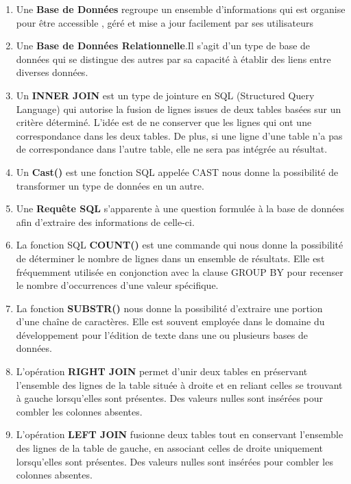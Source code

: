 \documentclass[
]{article}
\begin{document}
\begin{enumerate}
\def\labelenumi{\arabic{enumi}.}
\item
  Une \textbf{Base de Données} regroupe un ensemble d'informations qui
  est organise pour être accessible , géré et mise a jour facilement par
  ses utilisateurs
\item
  Une \textbf{Base de Données Relationnelle}.Il s'agit d'un type de base
  de données qui se distingue des autres par sa capacité à établir des
  liens entre diverses données.
\item
  Un \textbf{INNER JOIN} est un type de jointure en SQL (Structured
  Query Language) qui autorise la fusion de lignes issues de deux tables
  basées sur un critère déterminé. L'idée est de ne conserver que les
  lignes qui ont une correspondance dans les deux tables. De plus, si
  une ligne d'une table n'a pas de correspondance dans l'autre table,
  elle ne sera pas intégrée au résultat.
\item
  Un \textbf{Cast()} est une fonction SQL appelée CAST nous donne la
  possibilité de transformer un type de données en un autre.
\item
  Une \textbf{Requête SQL} s'apparente à une question formulée à la base
  de données afin d'extraire des informations de celle-ci.
\item
  La fonction SQL \textbf{COUNT()} est une commande qui nous donne la
  possibilité de déterminer le nombre de lignes dans un ensemble de
  résultats. Elle est fréquemment utilisée en conjonction avec la clause
  GROUP BY pour recenser le nombre d'occurrences d'une valeur
  spécifique.
\item
  La fonction \textbf{SUBSTR()} nous donne la possibilité d'extraire une
  portion d'une chaîne de caractères. Elle est souvent employée dans le
  domaine du développement pour l'édition de texte dans une ou plusieurs
  bases de données.
\item
  L'opération \textbf{RIGHT JOIN} permet d'unir deux tables en
  préservant l'ensemble des lignes de la table située à droite et en
  reliant celles se trouvant à gauche lorsqu'elles sont présentes. Des
  valeurs nulles sont insérées pour combler les colonnes absentes.
\item
  L'opération \textbf{LEFT JOIN} fusionne deux tables tout en conservant
  l'ensemble des lignes de la table de gauche, en associant celles de
  droite uniquement lorsqu'elles sont présentes. Des valeurs nulles sont
  insérées pour combler les colonnes absentes.
\end{enumerate}
\end{document}
